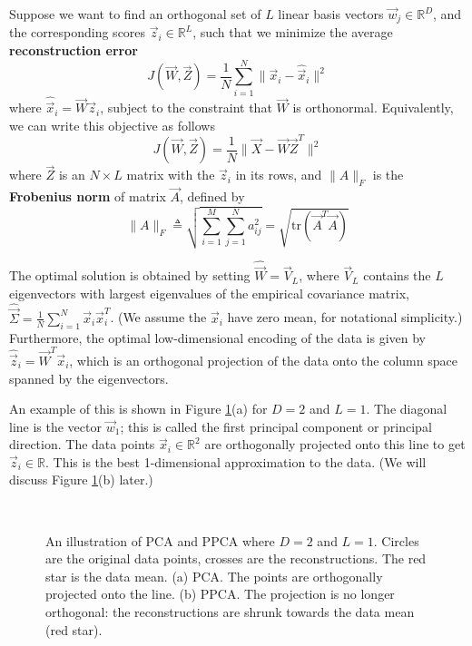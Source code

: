 \begin{theorem}
Suppose we want to find an orthogonal set of $L$ linear basis vectors $\vec{w}_j \in \mathbb{R}^D$, and the corresponding scores $\vec{z}_i \in \mathbb{R}^L$, such that we minimize the average \textbf{reconstruction error}
\begin{equation}
J(\vec{W},\vec{Z})=\frac{1}{N}\sum\limits_{i=1}^N \lVert\vec{x}_i-\hat{\vec{x}}_i\rVert^2
\end{equation}
where $\hat{\vec{x}}_i=\vec{W}\vec{z}_i$, subject to the constraint that $\vec{W}$ is orthonormal. Equivalently, we can write this objective as follows
\begin{equation}
J(\vec{W},\vec{Z})=\frac{1}{N} \lVert\vec{X}-\vec{W}\vec{Z}^T\rVert^2
\end{equation}
where $\vec{Z}$ is an $N \times L$ matrix with the $\vec{z}_i$ in its rows, and $\lVert A\rVert_F$ is the \textbf{Frobenius norm} of matrix $\vec{A}$, defined by
\begin{equation}
\lVert A\rVert_F \triangleq \sqrt{\sum\limits_{i=1}^M \sum\limits_{j=1}^N a_{ij}^2}=\sqrt{\mathrm{tr}(\vec{A}^T\vec{A})}
\end{equation}

The optimal solution is obtained by setting $\hat{\vec{W}}=\vec{V}_L$, where $\vec{V}_L$ contains the $L$ eigenvectors with largest eigenvalues of the empirical covariance matrix, $\hat{\vec{\Sigma}}=\frac{1}{N}\sum_{i=1}^N \vec{x}_i\vec{x}_i^T$. (We assume the $\vec{x}_i$ have zero mean, for notational simplicity.) Furthermore, the optimal low-dimensional encoding of the data is given by $\hat{\vec{z}}_i=\vec{W}^T\vec{x}_i$, which is an orthogonal projection of the data onto the column space spanned by the eigenvectors.
\end{theorem}

An example of this is shown in Figure \ref{fig:PCA-PPCA}(a) for $D=2$ and $L=1$. The diagonal line is the vector $\vec{w}_1$; this is called the first principal component or principal direction. The data points $\vec{x}_i \in \mathbb{R}^2$ are orthogonally projected onto this line to get $\vec{z}_i \in \mathbb{R}$. This is the best 1-dimensional approximation to the data. (We will discuss Figure \ref{fig:PCA-PPCA}(b) later.)

\begin{figure}[hbtp]
\centering
{} \\
\caption{An illustration of PCA and PPCA where $D=2$ and $L=1$. Circles are the original data points, crosses are the reconstructions. The red star is the data mean. (a) PCA. The points are orthogonally projected onto the line. (b) PPCA. The projection is no longer orthogonal: the reconstructions are shrunk towards the data mean (red star).}
\label{fig:PCA-PPCA} 
\end{figure}

